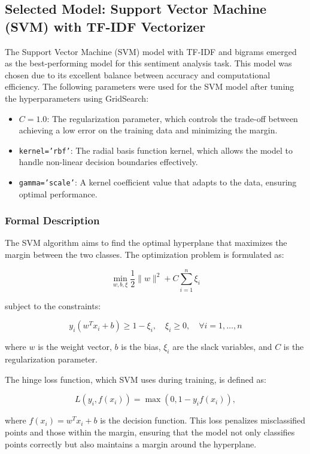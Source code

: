 \documentclass[a4paper,40pt,twocolumn]{article}
\begin{document}
\subsection{Selected Model: Support Vector Machine (SVM) with TF-IDF Vectorizer}

The Support Vector Machine (SVM) model with TF-IDF and bigrams emerged as the best-performing model for this sentiment analysis task. This model was chosen due to its excellent balance between accuracy and computational efficiency. The following parameters were used for the SVM model after tuning the hyperparameters using GridSearch:

\begin{itemize}
    \item \( C = 1.0 \): The regularization parameter, which controls the trade-off between achieving a low error on the training data and minimizing the margin.
    \item \texttt{kernel='rbf'}: The radial basis function kernel, which allows the model to handle non-linear decision boundaries effectively.
    \item \texttt{gamma='scale'}: A kernel coefficient value that adapts to the data, ensuring optimal performance.
\end{itemize}

\subsubsection{Formal Description}
The SVM algorithm aims to find the optimal hyperplane that maximizes the margin between the two classes. The optimization problem is formulated as:

\[
\min_{w,b,\xi} \frac{1}{2} \|w\|^2 + C \sum_{i=1}^{n} \xi_i
\]

subject to the constraints:

\[
y_i (w^T x_i + b) \geq 1 - \xi_i, \quad \xi_i \geq 0, \quad \forall i = 1, \dots, n
\]

where \( w \) is the weight vector, \( b \) is the bias, \( \xi_i \) are the slack variables, and \( C \) is the regularization parameter.

The hinge loss function, which SVM uses during training, is defined as:

\[
L(y_i, f(x_i)) = \max(0, 1 - y_i f(x_i)),
\]

where \( f(x_i) = w^T x_i + b \) is the decision function. This loss penalizes misclassified points and those within the margin, ensuring that the model not only classifies points correctly but also maintains a margin around the hyperplane.
\end{document}
